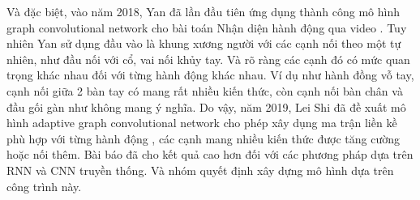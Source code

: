 Và đặc biệt, vào năm 2018, Yan đã lần đầu tiên ứng dụng thành công mô hình graph convolutional network cho bài toán Nhận diện hành động qua video \cite{yan2018spatial}. Tuy nhiên Yan sử dụng đầu vào là khung xương người với các cạnh nối theo một tự nhiên, như đầu nối với cổ, vai nối khủy tay. Và rõ ràng các cạnh đó có mức quan trọng khác nhau đối với từng hành động khác nhau. Ví dụ như hành đồng vỗ tay, cạnh nối giữa 2 bàn tay có mang rất nhiều kiến thức, còn cạnh nối bàn chân và đầu gối gàn như không mang ý nghĩa. Do vậy, năm 2019, Lei Shi đã đề xuất mô hình adaptive graph convolutional network cho phép xây dụng ma trận liền kề phù hợp với từng hành động \cite{shi2020skeleton}, các cạnh mang nhiều kiến thức được tăng cường hoặc nối thêm. Bài báo đã cho kết quả cao hơn đối với các phương pháp dựa trên RNN và CNN truyền thống. Và nhóm quyết định xây dựng mô hình dựa trên công trình này.

